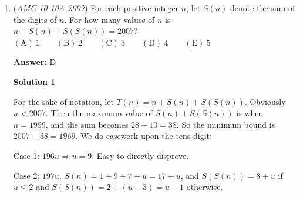 \begin{enumerate}
 \textbf{Answer: }B



\textbf{Solution}

The area we are trying to find is simply $ABFE-(\overarc{AEC}+\triangle{ACO}+\triangle{BDO}+\overarc{BFD}).\overline{EF}\parallel\overline{AB}$.  Thus, $ABFE$ is a \href{https://artofproblemsolving.com/wiki/index.php?title=Rectangle}{rectangle}, and so its area is $b\times{h}=2\times{(AO+OB)}=2\times{2(2\sqrt{2})}=8\sqrt{2}$.

 Since $\overline{OC}$ is tangent to circle $A$, $\triangle{ACO}$ is a right triangle.  We know $AO=2\sqrt{2}$ and $AC=2$, so $\triangle{ACO}$ is an isosceles right triangle, and has $\overline{CO}$ with length $2$.  The area of $\triangle{ACO}=\frac{1}{2}bh=2$.  By symmetry, $\triangle{ACO}\cong\triangle{BDO}$, and so the area of $\triangle{BDO}$ is also $2$.

 $\overarc{AEC}$ (or $\overarc{BFD}$, for that matter) is $\frac{1}{8}$ the area of its circle since $\angle{OAC}$ is 45 degrees and $\angle{OAE}$ forms a right \href{https://artofproblemsolving.com/wiki/index.php?title=Triangle}{triangle}.  Thus $\overarc{AEC}$ and $\overarc{BFD}$ both have an area of $\frac{\pi}{2}$.

 Plugging all of these areas back into the original equation yields $8\sqrt{2}-(\frac{\pi}{2}+2+2+\frac{\pi}{2})=8\sqrt{2}-(4+\pi)=\boxed{(B)\ 8\sqrt{2}-4-\pi}$.

 


	\item (\textit{AMC 10 10A 2007}) For each positive integer $n$, let $S(n)$ denote the sum of the digits of $n.$ For how many values of $n$ is $n + S(n) + S(S(n)) = 2007?$
$\mathrm{(A)}\ 1 \qquad \mathrm{(B)}\ 2 \qquad \mathrm{(C)}\ 3 \qquad \mathrm{(D)}\ 4 \qquad \mathrm{(E)}\ 5$

 \textbf{Answer: }D



\textbf{Solution 1}

For the sake of notation, let $T(n) = n + S(n) + S(S(n))$. Obviously $n<2007$. Then the maximum value of $S(n) + S(S(n))$ is when $n = 1999$, and the sum becomes $28 + 10 = 38$. So the minimum bound is $2007-38=1969$. We do \href{https://artofproblemsolving.com/wiki/index.php?title=Casework}{casework} upon the tens digit:

 Case 1: $196u \Longrightarrow u = 9$. Easy to directly disprove.

 Case 2: $197u$. $S(n) = 1 + 9 + 7 + u = 17 + u$, and $S(S(n)) = 8+u$ if $u \le 2$ and $S(S(n)) = 2 + (u-3) = u-1$ otherwise. 


\end{enumerate}
